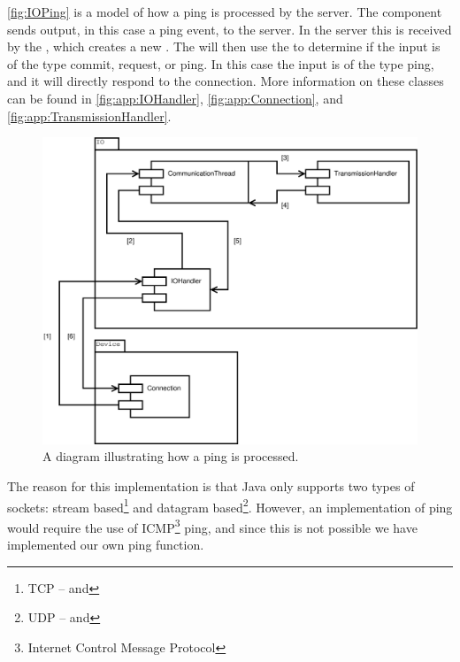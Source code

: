 \autoref{fig:IOPing} is a model of how a ping is processed by the server. The  component sends output, in this case a ping event, to the server. In the server this is received by the , which creates a new \newline {}.
The  will then use the \newline {} to determine if the input is of the type commit, request, or ping.
In this case the input is of the type ping, and it will directly respond to the connection. 
More information on these classes can be found in \autoref{fig:app:IOHandler}, \autoref{fig:app:Connection}, and \autoref{fig:app:TransmissionHandler}.
\begin{figure}[htbp]
	\centering
          \includegraphics[scale=0.40]{images/ping}
	\caption{A diagram illustrating how a ping is processed.} 
	\label{fig:IOPing}
\end{figure}

The reason for this implementation is that Java only supports two types of sockets: stream based\footnote{TCP --  and } and datagram based\footnote{UDP --  and }\cite{javaNET}.
However, an implementation of ping would require the use of ICMP\footnote{Internet Control Message Protocol} ping, and since this is not possible we have implemented our own ping function\cite{ICMP}.

